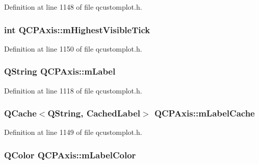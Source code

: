 Definition at line 1148 of file qcustomplot.\-h.

\hypertarget{class_q_c_p_axis_abb3b3ccce7e9779fef2be91ce1a46ef0}{
\subsubsection[{m\-Highest\-Visible\-Tick}]{\setlength{\rightskip}{0pt plus 5cm}int Q\-C\-P\-Axis\-::m\-Highest\-Visible\-Tick\hspace{0.3cm}{\ttfamily [protected]}}}\label{class_q_c_p_axis_abb3b3ccce7e9779fef2be91ce1a46ef0}


Definition at line 1150 of file qcustomplot.\-h.

\hypertarget{class_q_c_p_axis_ae8001dbdfc47685c1cf7b98b044460e6}{
\subsubsection[{m\-Label}]{\setlength{\rightskip}{0pt plus 5cm}Q\-String Q\-C\-P\-Axis\-::m\-Label\hspace{0.3cm}{\ttfamily [protected]}}}\label{class_q_c_p_axis_ae8001dbdfc47685c1cf7b98b044460e6}


Definition at line 1118 of file qcustomplot.\-h.

\hypertarget{class_q_c_p_axis_a0182a6e7505b3eeef63a019fa1d56388}{
\subsubsection[{m\-Label\-Cache}]{\setlength{\rightskip}{0pt plus 5cm}Q\-Cache$<$Q\-String, {\bf Cached\-Label}$>$ Q\-C\-P\-Axis\-::m\-Label\-Cache\hspace{0.3cm}{\ttfamily [protected]}}}\label{class_q_c_p_axis_a0182a6e7505b3eeef63a019fa1d56388}


Definition at line 1149 of file qcustomplot.\-h.

\hypertarget{class_q_c_p_axis_a457a003bb1c2b6ab73e5a173ba7558fd}{
\subsubsection[{m\-Label\-Color}]{\setlength{\rightskip}{0pt plus 5cm}Q\-Color Q\-C\-P\-Axis\-::m\-Label\-Color\hspace{0.3cm}{\ttfamily [protected]}}}\label{class_q_c_p_axis_a457a003bb1c2b6ab73e5a173ba7558fd}


